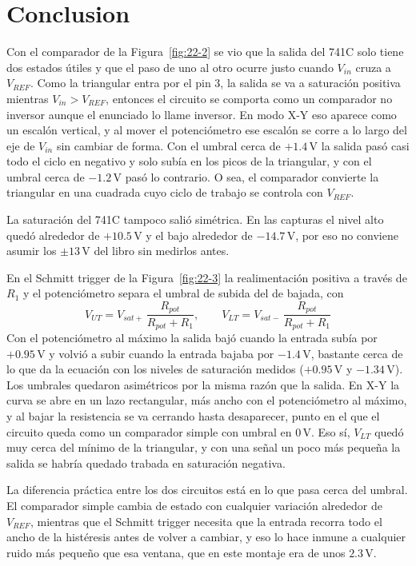 \documentclass[11pt]{article}
\begin{document}
\section*{Conclusion}

Con el comparador de la Figura~\ref{fig:22-2} se vio que la salida del 741C solo tiene dos estados útiles y que el paso de uno al otro ocurre justo cuando $V_{in}$ cruza a $V_{REF}$. Como la triangular entra por el pin 3, la salida se va a saturación positiva mientras $V_{in} > V_{REF}$, entonces el circuito se comporta como un comparador no inversor aunque el enunciado lo llame inversor. En modo X-Y eso aparece como un escalón vertical, y al mover el potenciómetro ese escalón se corre a lo largo del eje de $V_{in}$ sin cambiar de forma. Con el umbral cerca de $+1.4\,\text{V}$ la salida pasó casi todo el ciclo en negativo y solo subía en los picos de la triangular, y con el umbral cerca de $-1.2\,\text{V}$ pasó lo contrario. O sea, el comparador convierte la triangular en una cuadrada cuyo ciclo de trabajo se controla con $V_{REF}$.

La saturación del 741C tampoco salió simétrica. En las capturas el nivel alto quedó alrededor de $+10.5\,\text{V}$ y el bajo alrededor de $-14.7\,\text{V}$, por eso no conviene asumir los $\pm 13\,\text{V}$ del libro sin medirlos antes.

En el Schmitt trigger de la Figura~\ref{fig:22-3} la realimentación positiva a través de $R_1$ y el potenciómetro separa el umbral de subida del de bajada, con
\[
V_{UT} = V_{sat+}\,\frac{R_{pot}}{R_{pot}+R_1}, \qquad V_{LT} = V_{sat-}\,\frac{R_{pot}}{R_{pot}+R_1}
\]
Con el potenciómetro al máximo la salida bajó cuando la entrada subía por $+0.95\,\text{V}$ y volvió a subir cuando la entrada bajaba por $-1.4\,\text{V}$, bastante cerca de lo que da la ecuación con los niveles de saturación medidos ($+0.95\,\text{V}$ y $-1.34\,\text{V}$). Los umbrales quedaron asimétricos por la misma razón que la salida. En X-Y la curva se abre en un lazo rectangular, más ancho con el potenciómetro al máximo, y al bajar la resistencia se va cerrando hasta desaparecer, punto en el que el circuito queda como un comparador simple con umbral en $0\,\text{V}$. Eso sí, $V_{LT}$ quedó muy cerca del mínimo de la triangular, y con una señal un poco más pequeña la salida se habría quedado trabada en saturación negativa.

La diferencia práctica entre los dos circuitos está en lo que pasa cerca del umbral. El comparador simple cambia de estado con cualquier variación alrededor de $V_{REF}$, mientras que el Schmitt trigger necesita que la entrada recorra todo el ancho de la histéresis antes de volver a cambiar, y eso lo hace inmune a cualquier ruido más pequeño que esa ventana, que en este montaje era de unos $2.3\,\text{V}$.
\end{document}
